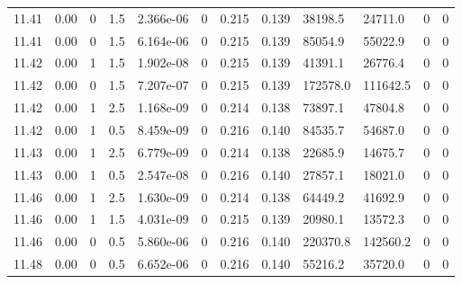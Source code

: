 \documentclass[preview]{standalone}
\begin{document}
{{{{{{{{{{{{{{{{{{{{\begin{tabular}{L{1.2cm}C{1.2cm} C{0.3cm}C{0.5cm} C{1.4cm}C{1.4cm} C{1.4cm}C{1.4cm} C{1.6cm}C{1.6cm} C{1.6cm}C{1.6cm}}
  11.41  &  0.00  & 0     & 1.5 &  2.366e-06  & 0  &  0.215&   0.139& 38198.5 & 24711.0   &  0 & 0  \\ 
  11.41  &  0.00  & 0     & 1.5 &  6.164e-06  & 0  &  0.215&   0.139& 85054.9 & 55022.9   &  0 & 0  \\ 
  11.42  &  0.00  & 1     & 1.5 &  1.902e-08  & 0  &  0.215&   0.139& 41391.1 & 26776.4   &  0 & 0  \\ 
  11.42  &  0.00  & 0     & 1.5 &  7.207e-07  & 0  &  0.215&   0.139& 172578.0 & 111642.5   &  0 & 0  \\ 
  11.42  &  0.00  & 1     & 2.5 &  1.168e-09  & 0  &  0.214&   0.138& 73897.1 & 47804.8   &  0 & 0  \\ 
  11.42  &  0.00  & 1     & 0.5 &  8.459e-09  & 0  &  0.216&   0.140& 84535.7 & 54687.0   &  0 & 0  \\ 
  11.43  &  0.00  & 1     & 2.5 &  6.779e-09  & 0  &  0.214&   0.138& 22685.9 & 14675.7   &  0 & 0  \\ 
  11.43  &  0.00  & 1     & 0.5 &  2.547e-08  & 0  &  0.216&   0.140& 27857.1 & 18021.0   &  0 & 0  \\ 
  11.46  &  0.00  & 1     & 2.5 &  1.630e-09  & 0  &  0.214&   0.138& 64449.2 & 41692.9   &  0 & 0  \\ 
  11.46  &  0.00  & 1     & 1.5 &  4.031e-09  & 0  &  0.215&   0.139& 20980.1 & 13572.3   &  0 & 0  \\ 
  11.46  &  0.00  & 0     & 0.5 &  5.860e-06  & 0  &  0.216&   0.140& 220370.8 & 142560.2   &  0 & 0  \\ 
  11.48  &  0.00  & 0     & 0.5 &  6.652e-06  & 0  &  0.216&   0.140& 55216.2 & 35720.0   &  0 & 0  \\ 
\hline 
\end{tabular} 

}}}}}}}}}}}}}}}}}}}}
\end{document}
